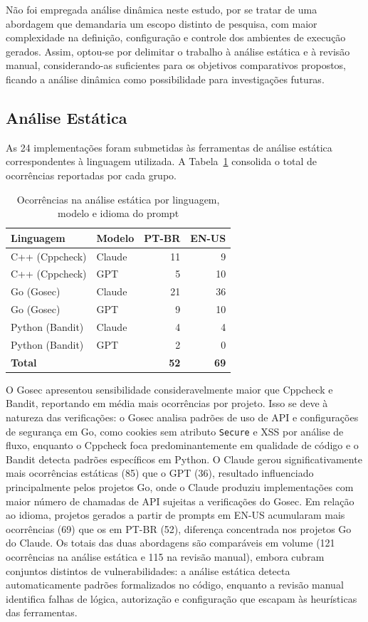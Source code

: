 \documentclass[12pt]{article}
\begin{document}
Não foi empregada análise dinâmica neste estudo, por se tratar de uma abordagem que demandaria um escopo distinto de pesquisa, com maior complexidade na definição, configuração e controle dos ambientes de execução gerados. Assim, optou-se por delimitar o trabalho à análise estática e à revisão manual, considerando-as suficientes para os objetivos comparativos propostos, ficando a análise dinâmica como possibilidade para investigações futuras.

\subsection{Análise Estática}

As 24 implementações foram submetidas às ferramentas de análise estática correspondentes à linguagem utilizada. A Tabela~\ref{tab:static} consolida o total de ocorrências reportadas por cada grupo.

\begin{table}[ht]
\centering
\caption{Ocorrências na análise estática por linguagem, modelo e idioma do prompt}
\label{tab:static}
\begin{tabular}{llrr}
\hline
\textbf{Linguagem} & \textbf{Modelo} & \textbf{PT-BR} & \textbf{EN-US} \\
\hline
C++ (Cppcheck) & Claude & 11 & 9 \\
C++ (Cppcheck) & GPT   & 5  & 10 \\
Go (Gosec)     & Claude & 21 & 36 \\
Go (Gosec)     & GPT   & 9  & 10 \\
Python (Bandit) & Claude & 4 & 4  \\
Python (Bandit) & GPT   & 2  & 0  \\
\hline
\textbf{Total}  &       & \textbf{52} & \textbf{69} \\
\hline
\end{tabular}
\end{table}

O Gosec apresentou sensibilidade consideravelmente maior que Cppcheck e Bandit, reportando em média mais ocorrências por projeto. Isso se deve à natureza das verificações: o Gosec analisa padrões de uso de API e configurações de segurança em Go, como cookies sem atributo \texttt{Secure} e XSS por análise de fluxo, enquanto o Cppcheck foca predominantemente em qualidade de código e o Bandit detecta padrões específicos em Python. O Claude gerou significativamente mais ocorrências estáticas (85) que o GPT (36), resultado influenciado principalmente pelos projetos Go, onde o Claude produziu implementações com maior número de chamadas de API sujeitas a verificações do Gosec. Em relação ao idioma, projetos gerados a partir de prompts em EN-US acumularam mais ocorrências (69) que os em PT-BR (52), diferença concentrada nos projetos Go do Claude. Os totais das duas abordagens são comparáveis em volume (121 ocorrências na análise estática e 115 na revisão manual), embora cubram conjuntos distintos de vulnerabilidades: a análise estática detecta automaticamente padrões formalizados no código, enquanto a revisão manual identifica falhas de lógica, autorização e configuração que escapam às heurísticas das ferramentas.
\end{document}
